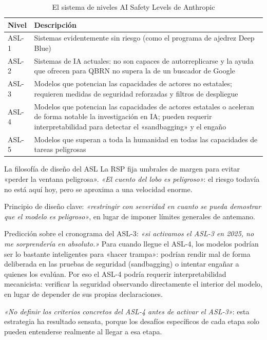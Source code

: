 \documentclass[a4paper]{article}
\begin{document}
\begin{table}[H]
\centering
\begin{tabular}{lp{9cm}}
\toprule
\textbf{Nivel} & \textbf{Descripción} \\
\midrule
ASL-1 & Sistemas evidentemente sin riesgo (como el programa de ajedrez Deep Blue) \\
ASL-2 & Sistemas de IA actuales: no son capaces de autorreplicarse y la ayuda que ofrecen para QBRN no supera la de un buscador de Google \\
ASL-3 & Modelos que potencian las capacidades de actores no estatales; requieren medidas de seguridad reforzadas y filtros de despliegue \\
ASL-4 & Modelos que potencian las capacidades de actores estatales o aceleran de forma notable la investigación en IA; pueden requerir interpretabilidad para detectar el «sandbagging» y el engaño \\
ASL-5 & Modelos que superan a toda la humanidad en todas las capacidades de tareas peligrosas \\
\bottomrule
\end{tabular}
\caption{El sistema de niveles AI Safety Levels de Anthropic}
\end{table}

\begin{importantbox}{La filosofía de diseño del ASL}
La RSP fija umbrales de margen para evitar «perder la ventana peligrosa». \textit{«El cuento del lobo es peligroso»}: el riesgo todavía no está aquí hoy, pero se aproxima a una velocidad enorme.

Principio de diseño clave: \textit{«restringir con severidad en cuanto se pueda demostrar que el modelo es peligroso»}, en lugar de imponer límites generales de antemano.
\end{importantbox}

Predicción sobre el cronograma del ASL-3: \textit{«si activamos el ASL-3 en 2025, no me sorprendería en absoluto.»} Para cuando llegue el ASL-4, los modelos podrían ser lo bastante inteligentes para «hacer trampa»: podrían rendir mal de forma deliberada en las pruebas de seguridad (sandbagging) o intentar engañar a quienes los evalúan. Por eso el ASL-4 podría requerir interpretabilidad mecanicista: verificar la seguridad observando directamente el interior del modelo, en lugar de depender de sus propias declaraciones.

\textit{«No definir los criterios concretos del ASL-4 antes de activar el ASL-3»}: esta estrategia ha resultado sensata, porque los desafíos específicos de cada etapa solo pueden entenderse realmente al llegar a esa etapa.
\end{document}
